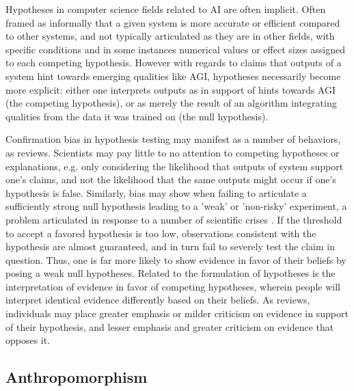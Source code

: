 \documentclass{article}
\theoremstyle{plain}
\theoremstyle{definition}
\theoremstyle{remark}
\begin{document}
Hypotheses in computer science fields related to AI are often implicit. Often framed as informally that a given system is more accurate or efficient compared to other systems, and not typically articulated as they are in other fields, with specific conditions and in some instances numerical values or effect sizes assigned to each competing hypothesis. However with regards to claims that outputs of a system hint towards emerging qualities like AGI, hypotheses necessarily become more explicit: either one interprets outputs as in support of hints towards AGI (the competing hypothesis), or as merely the result of an algorithm integrating qualities from the data it was trained on (the null hypothesis). 

Confirmation bias in hypothesis testing may manifest as a number of behaviors, as \cite{nickerson1998confirmation} reviews. Scientists may pay little to no attention to competing hypotheses or explanations, e.g. only considering the likelihood that outputs of system support one's claims, and not the likelihood that the same outputs might occur if one's hypothesis is false. Similarly, bias may show when failing to articulate a sufficiently strong null hypothesis leading to a 'weak' or 'non-risky' experiment, a problem articulated in response to a number of scientific crises \cite{claesen2022severity}. If the threshold to accept a favored hypothesis is too low, observations consistent with the hypothesis are almost guaranteed, and in turn fail to severely test the claim in question. Thus, one is far more likely to show evidence in favor of their beliefs by posing a weak null hypotheses. Related to the formulation of hypotheses is the interpretation of evidence in favor of competing hypotheses, wherein people will interpret identical evidence differently based on their beliefs. As \cite{nickerson1998confirmation} reviews, individuals may place greater emphasis or milder criticism on evidence in support of their hypothesis, and lesser emphasis and greater criticism on evidence that opposes it. 


\subsection{Anthropomorphism}
\end{document}
